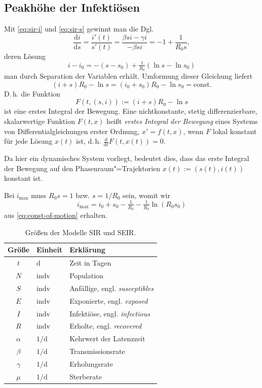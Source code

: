 \documentclass[a4paper,10pt,fleqn,twocolumn,twoside,dvipdfmx]{scrartcl}
\numberwithin{equation}{section}
\newcommand{\unit}[1]{\mathrm{#1}}
\newcommand{\strong}[1]{{\sffamily\bfseries #1}}
\begin{document}
\subsection{Peakhöhe der Infektiösen}

Mit \eqref{eq:sir-i} und \eqref{eq:sir-s} gewinnt man die Dgl.%
\begin{equation}
\frac{\mathrm di}{\mathrm ds} = \frac{i'(t)}{s'(t)}
= \frac{\beta si - \gamma i}{-\beta si} = -1 + \frac{1}{R_0 s},
\end{equation}
deren Lösung
\begin{equation}
i-i_0 = - (s-s_0) + \tfrac{1}{R_0}(\ln s - \ln s_0)
\end{equation}
man durch Separation der Variablen erhält. Umformung dieser
Gleichung liefert%
\begin{equation}\label{eq:const-of-motion}
(i+s)R_0-\ln s = (i_0+s_0)R_0-\ln s_0 = \mathrm{const}.
\end{equation}
D.\,h. die Funktion
\begin{equation}
F(t,(s,i)) := (i+s)R_0 - \ln s
\end{equation}
ist eine erstes Integral der Bewegung. Eine nichtkonstante, stetig
differenzierbare, skalarwertige Funktion $F(t,x)$
heißt \emph{erstes Integral der Bewegung} eines Systems
von Differentialgleichungen erster Ordnung, $x'=f(t,x)$,
wenn $F$ lokal konstant für jede Lösung $x(t)$ ist, d.\,h.
$\tfrac{\mathrm d}{\mathrm dt}F(t,x(t))=0$.

Da hier ein dynamisches System vorliegt, bedeutet dies, dass
das erste Integral der Bewegung auf den
Phasenraum"=Trajektorien $x(t):=(s(t),i(t))$ konstant ist.

Bei $i_\mathrm{max}$ muss $R_0 s = 1$ bzw. $s = 1/R_0$ sein, womit wir
\begin{equation}
i_\mathrm{max} = i_0 + s_0 - \tfrac{1}{R_0} - \tfrac{1}{R_0}\ln(R_0 s_0)
\end{equation}
aus \eqref{eq:const-of-motion} erhalten.

\begin{table}
\begin{tabular}{cll}
\toprule
\strong{Größe} & \strong{Einheit} & \strong{Erklärung}\\
\midrule
$t$ & $\unit{d}$ & Zeit in Tagen\\
$N$ & $\unit{indv}$ & Population\\
$S$ & $\unit{indv}$ & Anfällige, engl. \emph{susceptibles}\\
$E$ & $\unit{indv}$ & Exponierte, engl. \emph{exposed}\\
$I$ & $\unit{indv}$ & Infektiöse, engl. \emph{infectious}\\
$R$ & $\unit{indv}$ & Erholte, engl. \emph{recovered}\\
$\alpha$ & $1/\unit d$ & Kehrwert der Latenzzeit\\
$\beta$ & $1/\unit d$ & Transmissionsrate\\
$\gamma$ & $1/\unit d$ & Erholungsrate\\
$\mu$ & $1/\unit d$ & Sterberate\\
\bottomrule
\end{tabular}
\caption{Größen der Modelle SIR und SEIR.}
\end{table}
\end{document}
